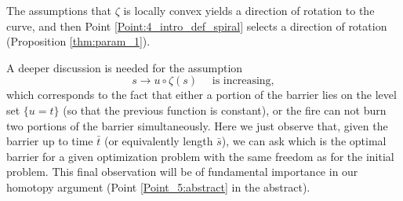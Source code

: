 \documentclass[reqno]{amsart}
\newcounter{assu}
\theoremstyle{definition} \newtheorem{definition}{Definition}[section]
\theoremstyle{definition} \newtheorem{remark}[definition]{Remark}
\theoremstyle{plain} \newtheorem{lemma}[definition]{Lemma}
\theoremstyle{plain} \newtheorem{proposition}[definition]{Proposition}
\theoremstyle{plain} \newtheorem{theorem}[definition]{Theorem}
\theoremstyle{plain} \newtheorem{corollary}[definition]{Corollary}
\theoremstyle{definition} \newtheorem{example}[definition]{Example}
\theoremstyle{plain} \newtheorem{claim}[clai]{Claim}
\theoremstyle{definition} \newtheorem{assumption}[definition]{Assumption}
\theoremstyle{definition} \newtheorem{observation}[definition]{Observation}
\newcommand{\1}{\mathbbm 1}
\numberwithin{equation}{section} %
\theoremstyle{plain} \newtheorem*{theorem*}{Theorem}
\theoremstyle{plain} \newtheorem{mthm}[maintheorem]{Main Theorem}
\theoremstyle{plain} \newtheorem*{mthm*}{Main Theorem}
\theoremstyle{plain} \newtheorem*{conjecture*}{Conjecture}
\theoremstyle{plain} \newtheorem{conjecture}[definition]{Conjecture}
\theoremstyle{plain} \newtheorem*{problem*}{Problem}
\begin{document}
The assumptions that $\zeta$ is locally convex yields a direction of rotation to the curve, and then Point \eqref{Point:4_intro_def_spiral} selects a direction of rotation (Proposition \ref{thm:param_1}).

%
%

A deeper discussion is needed for the assumption %
\begin{equation*}
s \rightarrow u\circ\zeta(s) \quad \text{ is increasing},
\end{equation*}
which corresponds to the fact that either a portion of the barrier lies on the level set $\lbrace u=t\rbrace$ (so that the previous function is constant), or the fire can not burn two portions of the barrier simultaneously. %
Here we just observe that, given the barrier up to time $\bar t$ (or equivalently length $\bar s$), we can ask which is the optimal barrier for a given optimization problem with the same freedom as for the initial problem. This final observation will be of fundamental importance in our homotopy argument (Point \eqref{Point_5:abstract} in the abstract).


%

\medskip
\end{document}
